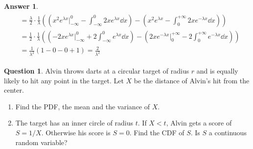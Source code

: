 \documentclass[utf8]{article}
\theoremstyle{definition}%
\newtheorem{question}{Question} %
\theoremstyle{plain}%
\newtheorem{answer}{Answer} %
\begin{document}
\begin{answer}
\begin{align}
\begin{aligned}
        &= \frac{\lambda}{2}\cdot\frac{1}{\lambda} \left(\left(x^2e^{\lambda x}\Big|_{-\infty}^{0} - \int_{-\infty}^{0}2xe^{\lambda x}\dd{x}\right) - \left(x^2e^{\lambda x} - \int_{0}^{+\infty}2xe^{-\lambda x}\dd{x}\right)\right) \\
        &= \frac{1}{2} \cdot \frac{1}{\lambda} \left(\left(-2xe^{\lambda x}\Big|_{-\infty}^{0} + 2\int_{-\infty}^{0}e^{\lambda x}\dd{x}\right) - \left(2xe^{-\lambda x}\Big|_{0}^{+\infty} - 2\int_{0}^{+\infty}e^{-\lambda x}\dd{x}\right)\right) \\
        &= \frac{1}{\lambda^2} \left(1 - 0 - 0 + 1\right) = \frac{2}{\lambda^2}
    \end{aligned}
    \end{align}
\end{answer}

\begin{question}
    Alvin throws darts at a circular target of radius $r$ and is equally likely to hit any point in the target. Let $X$ be the distance of Alvin's hit from the center.
    \begin{enumerate}[label=(\alph*)]
        \item Find the PDF, the mean and the variance of $X$.
        \item The target has an inner circle of radius $t$. If $X < t$, Alvin gets a score of $S = 1/X$. Otherwise his score is $S = 0$. Find the CDF of $S$. Is $S$ a continuous random variable?
    \end{enumerate}
\end{question}
\end{document}
